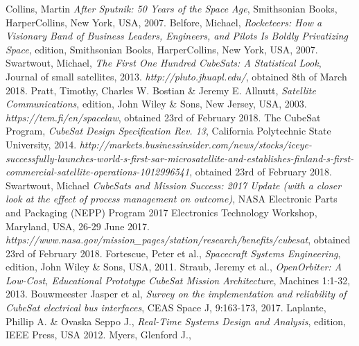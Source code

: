 \documentclass[english,12pt,a4paper,pdftex,elec,utf8]{aaltothesis}
\begin{document}
{}
\begin{thebibliography}{99}

 Collins, Martin
  \textit{After Sputnik: 50 Years of the Space Age}, Smithsonian Books, HarperCollins, New York, USA, 2007.
 Belfore, Michael,
  \textit{Rocketeers: How a Visionary Band of Business Leaders, Engineers, and Pilots Is Boldly Privatizing Space},  edition, Smithsonian Books, HarperCollins, New York, USA, 2007.
 Swartwout, Michael,
  \textit{The First One Hundred CubeSats: A Statistical Look}, Journal of small satellites, 2013. 
  \textit{http://pluto.jhuapl.edu/}, obtained 8th of March 2018. 
 Pratt, Timothy, Charles W. Bostian \& Jeremy E. Allnutt,
  \textit{Satellite Communications},  edition, John Wiley \& Sons, New Jersey, USA, 2003.
  \textit{https://tem.fi/en/spacelaw}, obtained 23rd of February 2018.
 The CubeSat Program,
  \textit{CubeSat Design Specification Rev. 13}, California Polytechnic State University, 2014.
  \textit{http://markets.businessinsider.com/news/stocks/iceye-successfully-launches-world-s-first-sar-microsatellite-and-establishes-finland-s-first-commercial-satellite-operations-1012996541}, obtained 23rd of February 2018.
 Swartwout, Michael
  \textit{CubeSats and Mission Success: 2017 Update (with a closer look at the effect of process management on outcome)}, NASA Electronic Parts and Packaging (NEPP) Program
2017 Electronics Technology Workshop, Maryland, USA, 26-29 June 2017.
  \textit{https://www.nasa.gov/mission\_pages/station/research/benefits/cubesat}, obtained 23rd of February 2018.
 Fortescue, Peter et al.,
  \textit{Spacecraft Systems Engineering},  edition, John Wiley \& Sons, USA, 2011.
 Straub, Jeremy et al.,
  \textit{OpenOrbiter: A Low-Cost, Educational Prototype CubeSat Mission Architecture}, Machines 1:1-32, 2013.
 Bouwmeester Jasper et al,
  \textit{Survey on the implementation and reliability of CubeSat electrical bus interfaces}, CEAS Space J, 9:163-173, 2017.
 Laplante, Phillip A. \& Ovaska Seppo J.,
  \textit{Real-Time Systems Design and Analysis},  edition, IEEE Press, USA 2012.
 Myers, Glenford J.,

\end{thebibliography}
\end{document}
